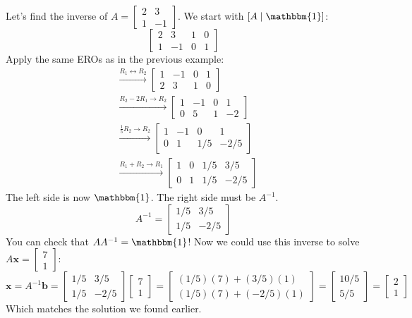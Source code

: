 \documentclass[11pt]{article}
\newcommand{\x}{\mathbf{x}}
\newcommand{\bb}{\mathbf{b}}
\newcommand{\id}{\mathbbm{1}}
\begin{document}
\begin{example}[Finding $A^{-1}$]
Let's find the inverse of $A = \begin{bmatrix} 2 & 3 \\ 1 & -1 \end{bmatrix}$. We start with $[A \mid \id]$:
\[ \left[ \begin{array}{cc|cc} 2 & 3 & 1 & 0 \\ 1 & -1 & 0 & 1 \end{array} \right] \]
Apply the same EROs as in the previous example:
\begin{align*}
&\xrightarrow{R_1 \leftrightarrow R_2}
\left[ \begin{array}{cc|cc} 1 & -1 & 0 & 1 \\ 2 & 3 & 1 & 0 \end{array} \right] \\
&\xrightarrow{R_2 - 2R_1 \to R_2}
\left[ \begin{array}{cc|cc} 1 & -1 & 0 & 1 \\ 0 & 5 & 1 & -2 \end{array} \right] \\
&\xrightarrow{\frac{1}{5} R_2 \to R_2}
\left[ \begin{array}{cc|cc} 1 & -1 & 0 & 1 \\ 0 & 1 & 1/5 & -2/5 \end{array} \right] \\
&\xrightarrow{R_1 + R_2 \to R_1}
\left[ \begin{array}{cc|cc} 1 & 0 & 1/5 & 3/5 \\ 0 & 1 & 1/5 & -2/5 \end{array} \right]
\end{align*}
The left side is now $\id$. The right side must be $A^{-1}$.
\[ A^{-1} = \begin{bmatrix} 1/5 & 3/5 \\ 1/5 & -2/5 \end{bmatrix} \]
You can check that $A A^{-1} = \id$! Now we could use this inverse to solve $A\x = \begin{bmatrix} 7 \\ 1 \end{bmatrix}$:
\[ \x = A^{-1}\bb = \begin{bmatrix} 1/5 & 3/5 \\ 1/5 & -2/5 \end{bmatrix} \begin{bmatrix} 7 \\ 1 \end{bmatrix} = \begin{bmatrix} (1/5)(7) + (3/5)(1) \\ (1/5)(7) + (-2/5)(1) \end{bmatrix} = \begin{bmatrix} 10/5 \\ 5/5 \end{bmatrix} = \begin{bmatrix} 2 \\ 1 \end{bmatrix} \]
Which matches the solution we found earlier.
\end{example}
\end{document}
